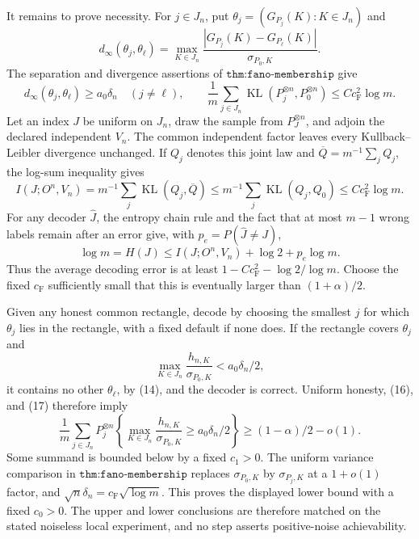 It remains to prove necessity.  For \(j\in J_n\), put \(\theta_j=(G_{P_j}(K):K\in J_n)\) and
\[
 d_\infty(\theta_j,\theta_\ell)=
 \max_{K\in J_n}\frac{|G_{P_j}(K)-G_{P_\ell}(K)|}{\sigma_{P_0,K}}.
\]
The separation and divergence assertions of \(\texttt{thm:fano-membership}\) give
\[
 d_\infty(\theta_j,\theta_\ell)\geq a_0\delta_n\quad(j\neq\ell),
 \qquad
 \frac1m\sum_{j\in J_n}\operatorname{KL}(P_j^{\otimes n},P_0^{\otimes n})
 \leq Cc_{\mathrm F}^2\log m.                                                    \tag{14}
\]
Let an index \(J\) be uniform on \(J_n\), draw the sample from \(P_J^{\otimes n}\), and adjoin the declared independent \(V_n\).  The common independent factor leaves every Kullback--Leibler divergence unchanged.  If \(Q_j\) denotes this joint law and \(\overline Q=m^{-1}\sum_jQ_j\), the log-sum inequality gives
\[
 I(J;O^n,V_n)=m^{-1}\sum_j\operatorname{KL}(Q_j,\overline Q)
 \leq m^{-1}\sum_j\operatorname{KL}(Q_j,Q_0)
 \leq Cc_{\mathrm F}^2\log m.                                                    \tag{15}
\]
For any decoder \(\widehat J\), the entropy chain rule and the fact that at most \(m-1\) wrong labels remain after an error give, with \(p_e=P(\widehat J\neq J)\),
\[
 \log m=H(J)\leq I(J;O^n,V_n)+\log2+p_e\log m.                                  \tag{16}
\]
Thus the average decoding error is at least \(1-Cc_{\mathrm F}^2-\log2/\log m\).  Choose the fixed \(c_{\mathrm F}\) sufficiently small that this is eventually larger than \((1+\alpha)/2\).

Given any honest common rectangle, decode by choosing the smallest \(j\) for which \(\theta_j\) lies in the rectangle, with a fixed default if none does.  If the rectangle covers \(\theta_j\) and
\[
 \max_{K\in J_n}\frac{h_{n,K}}{\sigma_{P_0,K}}<a_0\delta_n/2,                  \tag{17}
\]
it contains no other \(\theta_\ell\), by (14), and the decoder is correct.  Uniform honesty, (16), and (17) therefore imply
\[
 \frac1m\sum_{j\in J_n}P_j^{\otimes n}\!\left\{
 \max_{K\in J_n}\frac{h_{n,K}}{\sigma_{P_0,K}}\geq a_0\delta_n/2\right\}
 \geq(1-\alpha)/2-o(1).                                                          \tag{18}
\]
Some summand is bounded below by a fixed \(c_1>0\).  The uniform variance comparison in \(\texttt{thm:fano-membership}\) replaces \(\sigma_{P_0,K}\) by \(\sigma_{P_j,K}\) at a \(1+o(1)\) factor, and \(\sqrt n\delta_n=c_{\mathrm F}\sqrt{\log m}\).  This proves the displayed lower bound with a fixed \(c_0>0\).  The upper and lower conclusions are therefore matched on the stated noiseless local experiment, and no step asserts positive-noise achievability.